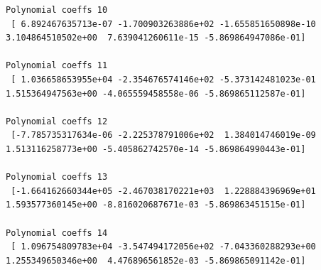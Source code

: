 \documentclass[11pt]{article}
\begin{document}
\begin{verbatim}
Polynomial coeffs 10 
 [ 6.892467635713e-07 -1.700903263886e+02 -1.655851650898e-10  3.104864510502e+00  7.639041260611e-15 -5.869864947086e-01]

Polynomial coeffs 11 
 [ 1.036658653955e+04 -2.354676574146e+02 -5.373142481023e-01  1.515364947563e+00 -4.065559458558e-06 -5.869865112587e-01]

Polynomial coeffs 12 
 [-7.785735317634e-06 -2.225378791006e+02  1.384014746019e-09  1.513116258773e+00 -5.405862742570e-14 -5.869864990443e-01]

Polynomial coeffs 13 
 [-1.664162660344e+05 -2.467038170221e+03  1.228884396969e+01  1.593577360145e+00 -8.816020687671e-03 -5.869863451515e-01]

Polynomial coeffs 14 
 [ 1.096754809783e+04 -3.547494172056e+02 -7.043360288293e+00  1.255349650346e+00  4.476896561852e-03 -5.869865091142e-01]

\end{verbatim}
\end{document}
